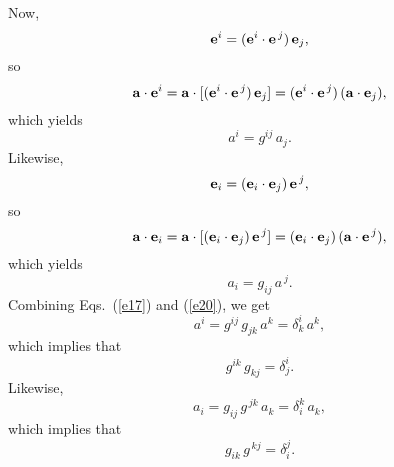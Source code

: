 \documentclass[12pt,prb,aps,notitlepage]{revtex4-1}
\begin{document}
 Now, 
 \begin{equation}
 {\bf e}^i = ({\bf e}^i\cdot{\bf e}^{\,j})\,{\bf e}_j,
 \end{equation}
so
\begin{equation}
{\bf a}\cdot{\bf e}^i = {\bf a}\cdot[ ({\bf e}^i\cdot{\bf e}^{\,j})\,{\bf e}_j]=( {\bf e}^i\cdot{\bf e}^{\,j})\,({\bf a}\cdot{\bf e}_j),
\end{equation}
which yields
\begin{equation}\label{e17}
a^i = g^{ij}\,a_j.
\end{equation}
Likewise, 
\begin{equation}
 {\bf e}_i = ({\bf e}_i\cdot{\bf e}_j)\,{\bf e}^{\,j},
 \end{equation}
so 
\begin{equation}
{\bf a}\cdot{\bf e}_i = {\bf a}\cdot[ ({\bf e}_i\cdot{\bf e}_j)\,{\bf e}^{\,j}]= ({\bf e}_i\cdot{\bf e}_j)\,({\bf a}\cdot{\bf e}^{\,j}),
\end{equation}
which yields
\begin{equation}\label{e20}
a_i = g_{ij}\,a^{\,j}.
\end{equation}
Combining Eqs.~(\ref{e17}) and (\ref{e20}), we get
\begin{equation}
a^i = g^{ij}\,g_{jk}\,a^k = \delta^{i}_k\,a^k,
\end{equation}
which implies that
\begin{equation}
g^{ik}\,g_{kj}= \delta^{i}_j.
\end{equation}
Likewise, 
\begin{equation}
a_i = g_{ij}\,g^{\,jk}\,a_k = \delta_{i}^k\,a_k,
\end{equation}
which implies that
\begin{equation}
g_{ik}\,g^{\,kj}= \delta_{i}^j.
\end{equation}
\end{document}
